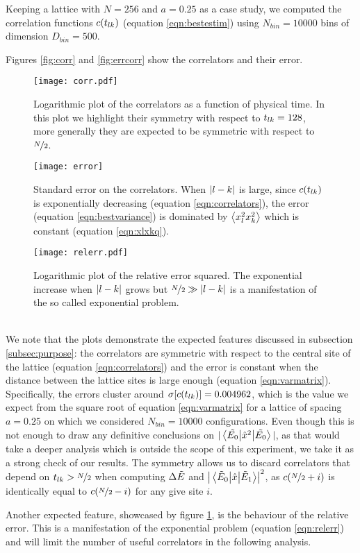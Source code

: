 Keeping a lattice with $N=256$ and $a=0.25$ as a case study, we computed the correlation functions $c(t_{lk})$ (equation \ref{eqn:bestestim})
using $N_{bin}=10000$ bins of dimension $D_{bin}=500$.

Figures \ref{fig:corr} and \ref{fig:errcorr} show the correlators and their error.
\begin{figure}[h!]
\centering
\texttt{[image: corr.pdf]}
\caption{\label{fig:corr}Logarithmic plot of the correlators as a function of physical time. In this plot we highlight their symmetry with respect to $t_{lk}=128$,
more generally they are expected to be symmetric with respect to $\nicefrac{N}{2}$.}
\texttt{[image: error]}
\caption{\label{fig:errcorr}Standard error on the correlators. When $\abs{l-k}$ is large, since $c(t_{lk})$ is exponentially decreasing (equation \ref{eqn:correlators}), the error (equation \ref{eqn:bestvariance}) is dominated by
$\ev{x_{l}^{2}x_{k}^{2}}$ which is constant (equation \ref{eqn:xlxkq}).} \texttt{[image: relerr.pdf]}
  \caption{\label{fig:relerr}Logarithmic plot of the relative error squared. The exponential increase when $\abs{l-k}$ grows but $\nicefrac{N}{2}\gg\abs{l-k}$ is a manifestation of the so called exponential problem.}

\end{figure}
\\
We note that the plots demonstrate the expected features discussed in subsection \ref{subsec:purpose}: the correlators are symmetric with respect to the central site of the lattice (equation \ref{eqn:correlators}) and the error is constant when the distance between the lattice sites is large enough (equation \ref{eqn:varmatrix}).
Specifically, the errors cluster around $\sigma[c(t_{lk})] = 0.004962$, which is the value we expect from the square root of equation \ref{eqn:varmatrix} for a lattice of spacing $a=0.25$ on which we considered $N_{bin}=10000$ configurations. Even though this is not enough to draw any definitive conclusions on $|\mel{\tilde{E_{0}}}{\hat{x}^{2}}{\tilde{E_{0}}}|$, as that would take a deeper analysis which is outside the scope of this experiment, we take it as a strong check of our results.
The symmetry allows us to discard correlators that depend on $t_{lk} > \nicefrac{N}{2}$ when computing $\Delta \tilde{E}$ and $\abs{\mel{\tilde{E}_0}{\hat{x}}{\tilde{E}_1}} ^2$, as $c(\nicefrac{N}{2}+i)$ is identically equal to $c(\nicefrac{N}{2}-i)$ for any give site $i$.

Another expected feature, showcased by figure \ref{fig:relerr}, is the behaviour of the relative error. This is a manifestation of the exponential problem (equation \ref{eqn:relerr}) and will limit the number
of useful correlators in the following analysis.
